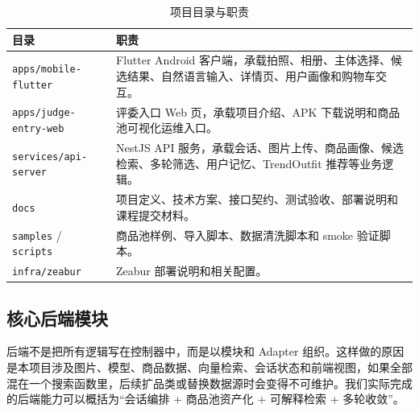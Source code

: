 \documentclass[UTF8,a4paper,zihao=-4]{ctexart}
\newcommand{\code}[1]{\texttt{\small #1}}
\begin{document}
\begin{table}[H]
\centering
\caption{项目目录与职责}
\begin{tabularx}{\textwidth}{p{4.2cm}Y}
\toprule
目录 & 职责 \\
\midrule
\code{apps/mobile-flutter} & Flutter Android 客户端，承载拍照、相册、主体选择、候选结果、自然语言输入、详情页、用户画像和购物车交互。 \\
\code{apps/judge-entry-web} & 评委入口 Web 页，承载项目介绍、APK 下载说明和商品池可视化运维入口。 \\
\code{services/api-server} & NestJS API 服务，承载会话、图片上传、商品画像、候选检索、多轮筛选、用户记忆、TrendOutfit 推荐等业务逻辑。 \\
\code{docs} & 项目定义、技术方案、接口契约、测试验收、部署说明和课程提交材料。 \\
\code{samples} / \code{scripts} & 商品池样例、导入脚本、数据清洗脚本和 smoke 验证脚本。 \\
\code{infra/zeabur} & Zeabur 部署说明和相关配置。 \\
\bottomrule
\end{tabularx}
\end{table}

\subsection{核心后端模块}

后端不是把所有逻辑写在控制器中，而是以模块和 Adapter 组织。这样做的原因是本项目涉及图片、模型、商品数据、向量检索、会话状态和前端视图，如果全部混在一个搜索函数里，后续扩品类或替换数据源时会变得不可维护。我们实际完成的后端能力可以概括为“会话编排 + 商品池资产化 + 可解释检索 + 多轮收敛”。
\end{document}
